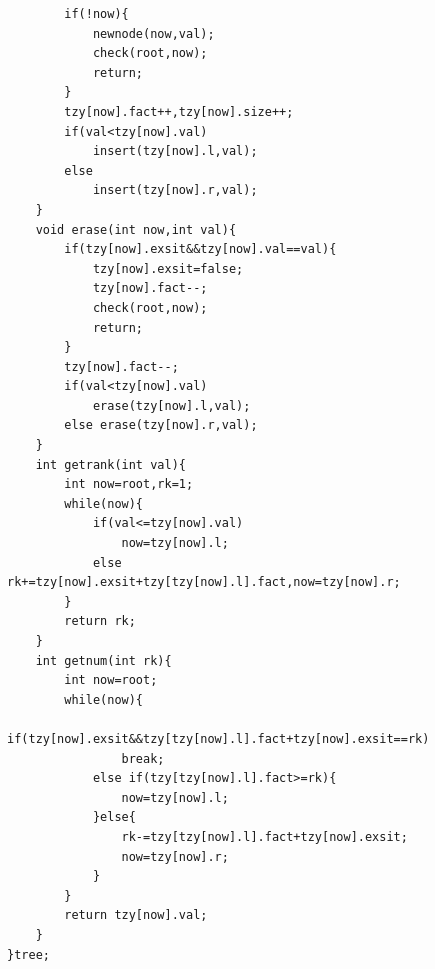 \documentclass[a4]{ctexart}
\begin{document}
\begin{lstlisting}
        if(!now){
            newnode(now,val);
            check(root,now);
            return;
        }
        tzy[now].fact++,tzy[now].size++;
        if(val<tzy[now].val)
            insert(tzy[now].l,val);
        else
            insert(tzy[now].r,val);
    }
    void erase(int now,int val){
        if(tzy[now].exsit&&tzy[now].val==val){
            tzy[now].exsit=false;
            tzy[now].fact--;
            check(root,now);
            return;
        }
        tzy[now].fact--;
        if(val<tzy[now].val)
            erase(tzy[now].l,val);
        else erase(tzy[now].r,val);
    }
    int getrank(int val){
        int now=root,rk=1;
        while(now){
            if(val<=tzy[now].val)
                now=tzy[now].l;
            else rk+=tzy[now].exsit+tzy[tzy[now].l].fact,now=tzy[now].r;
        }
        return rk;
    }
    int getnum(int rk){
        int now=root;
        while(now){
            if(tzy[now].exsit&&tzy[tzy[now].l].fact+tzy[now].exsit==rk)
                break;
            else if(tzy[tzy[now].l].fact>=rk){
                now=tzy[now].l;
            }else{
                rk-=tzy[tzy[now].l].fact+tzy[now].exsit;
                now=tzy[now].r;
            }
        }
        return tzy[now].val;
    }
}tree;
\end{lstlisting}
\end{document}
